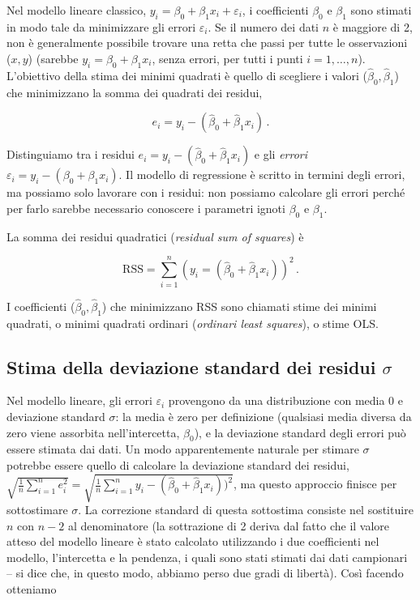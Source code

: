 \documentclass[
  11pt,
]{krantz}
\theoremstyle{definition}
\theoremstyle{definition}
\theoremstyle{definition}
\theoremstyle{definition}
\theoremstyle{remark}
\begin{document}
Nel modello lineare classico, \(y_i = \beta_0 + \beta_1 x_i + \varepsilon_i\), i coefficienti \(\beta_0\) e \(\beta_1\) sono stimati in modo tale da minimizzare gli errori \(\varepsilon_i\). Se il numero dei dati \(n\) è maggiore di 2, non è generalmente possibile trovare una retta che passi per tutte le osservazioni (\(x, y\)) (sarebbe \(y_i = \beta_0 + \beta_1 x_i\), senza errori, per tutti i punti \(i = 1, \dots, n\)). L'obiettivo della stima dei minimi quadrati è quello di scegliere i valori (\(\hat{\beta}_0, \hat{\beta}_1\)) che minimizzano la somma dei quadrati dei residui,

\begin{equation}
e_i = y_i − (\hat{\beta}_0 + \hat{\beta}_1 x_i)\,.
\end{equation}

Distinguiamo tra i residui \(e_i = y_i - (\hat{\beta}_0 + \hat{\beta}_1 x_i)\) e gli \emph{errori} \(\varepsilon_i = y_i − (\beta_0 + \beta_1 x_i)\). Il modello di regressione è scritto in termini degli errori, ma possiamo solo lavorare con i residui: non possiamo calcolare gli errori perché per farlo sarebbe necessario conoscere i parametri ignoti \(\beta_0\) e \(\beta_1\).

La somma dei residui quadratici (\emph{residual sum of squares}) è

\begin{equation}
\text{RSS} = \sum_{i=1}^n (y_i = (\hat{\beta}_0 + \hat{\beta}_1 x_i))^2\,.
\end{equation}

I coefficienti (\(\hat{\beta}_0, \hat{\beta}_1\)) che minimizzano RSS sono chiamati stime dei minimi quadrati, o minimi quadrati ordinari (\emph{ordinari least squares}), o stime OLS.

\hypertarget{stima-della-deviazione-standard-dei-residui-sigma}{%
\subsection{\texorpdfstring{Stima della deviazione standard dei residui \(\sigma\)}{Stima della deviazione standard dei residui \textbackslash sigma}}\label{stima-della-deviazione-standard-dei-residui-sigma}}

Nel modello lineare, gli errori \(\varepsilon_i\) provengono da una distribuzione con media 0 e deviazione standard \(\sigma\): la media è zero per definizione (qualsiasi media diversa da zero viene assorbita nell'intercetta, \(\beta_0\)), e la deviazione standard degli errori può essere stimata dai dati. Un modo apparentemente naturale per stimare \(\sigma\) potrebbe essere quello di calcolare la deviazione standard dei residui, \(\sqrt{\frac{1}{n} \sum_{i=1}^n e_i^2} = \sqrt{ \frac{1}{n} \sum_{i=1}^n y_i - (\hat{\beta}_0 + \hat{\beta}_1 x_i))^2}\), ma questo approccio finisce per sottostimare \(\sigma\). La correzione standard di questa sottostima consiste nel sostituire \(n\) con \(n - 2\) al denominatore (la sottrazione di 2 deriva dal fatto che il valore atteso del modello lineare è stato calcolato utilizzando i due coefficienti nel modello, l'intercetta e la pendenza, i quali sono stati stimati dai dati campionari -- si dice che, in questo modo, abbiamo perso due gradi di libertà). Così facendo otteniamo
\end{document}
